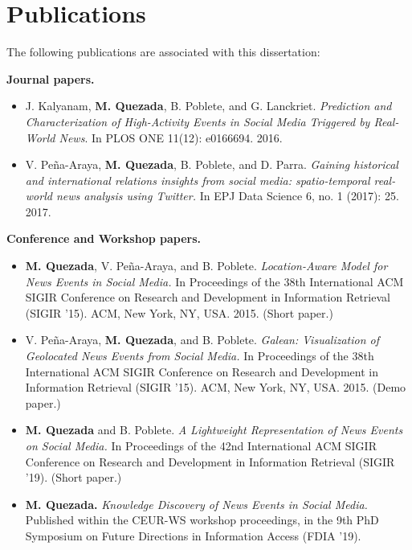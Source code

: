 \newpage

\section*{Publications} 

The following publications are associated with this dissertation:

{\bf Journal papers.}
\begin{itemize}
    \setlength\itemsep{1em}

    \item J. Kalyanam, {\bf M. Quezada}, B. Poblete, and G. Lanckriet. {\em
     Prediction and Characterization of High-Activity Events in Social Media
     Triggered by Real-World News}. In PLOS ONE 11(12): e0166694. 2016.

    \item V. Peña-Araya, {\bf M. Quezada}, B. Poblete, and D. Parra. {\em
    Gaining historical and international relations insights from social media:
    spatio-temporal real-world news analysis using Twitter.} In EPJ Data Science
    6, no. 1 (2017): 25. 2017.
\end{itemize}

\vspace{1em}

{\bf Conference and Workshop papers.}

\begin{itemize}
    \setlength\itemsep{1em}

    \item {\bf M. Quezada}, V. Peña-Araya, and B. Poblete. {\em Location-Aware
    Model for News Events in Social Media.} In Proceedings of the 38th
    International ACM SIGIR Conference on Research and Development in
    Information Retrieval (SIGIR '15). ACM, New York, NY, USA. 2015.
    (Short paper.)

    \item V. Peña-Araya, {\bf M. Quezada}, and B. Poblete. {\em Galean:
    Visualization of Geolocated News Events from Social Media.} In Proceedings
    of the 38th International ACM SIGIR Conference on Research and Development
    in Information Retrieval (SIGIR '15). ACM, New York, NY, USA. 2015.
    (Demo paper.)

    \item {\bf M. Quezada} and B. Poblete. {\em A Lightweight Representation of
    News Events on Social Media.} In Proceedings of the 42nd International ACM
    SIGIR Conference on Research and Development in Information Retrieval (SIGIR
    '19). (Short paper.)

    \item {\bf M. Quezada.} {\em Knowledge Discovery of News Events in Social
    Media.} Published within the CEUR-WS workshop proceedings, in the 9th
    PhD Symposium on Future Directions in Information Access (FDIA '19). 

\end{itemize}


